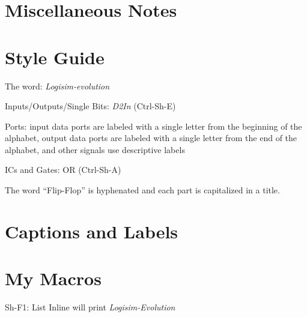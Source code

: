 \section{Miscellaneous Notes}

\section{Style Guide}
\item The word: \textit{Logisim-evolution}
\item Inputs/Outputs/Single Bits: \emph{D2In} (Ctrl-Sh-E)
\item Ports: input data ports are labeled with a single letter from the beginning of the alphabet, output data ports are labeled with a single letter from the end of the alphabet, and other signals use descriptive labels
\item ICs and Gates: \textsf{OR} (Ctrl-Sh-A)
\item The word ``Flip-Flop'' is hyphenated and each part is capitalized in a title.

\section{Captions and Labels}

\section{My Macros}
Sh-F1: List Inline
\Le will print \textit{Logisim-Evolution}


